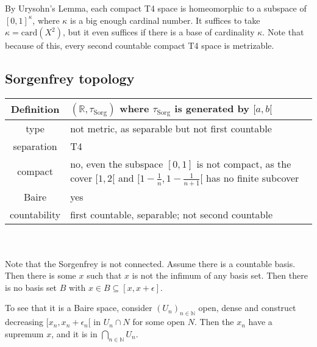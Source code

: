 \documentclass{scrartcl}
\newcommand{\R}{\mathbb{R}}
\newcommand{\N}{\mathbb{N}}
\begin{document}
By Urysohn's Lemma, each compact T4 space is homeomorphic to a subspace of $[0, 1]^\kappa$, where $\kappa$ is a big enough cardinal number. It suffices to take $\kappa = \mathrm{card}(X^2)$, but it even suffices if there is a base of cardinality $\kappa$. Note that because of this, every second countable compact T4 space is metrizable.

\subsection{Sorgenfrey topology}
\label{top:sorgenfrey}
\begin{tabular}{c | p{}}
    Definition & $(\R, \tau_{\mathrm{Sorg}})$ where $\tau_{\mathrm{Sorg}}$ is generated by $[a, b[$ \\
    \hline
    type & not metric, as separable but not first countable \\
    separation & T4 \\
    compact & no, even the subspace $[0, 1]$ is not compact, as the cover $[1, 2[$ and $[1 - \frac 1 n, 1 - \frac 1 {n + 1}[$ has no finite subcover \\
    Baire & yes \\
    countability & first countable, separable; not second countable
\end{tabular}
\\\\
Note that the Sorgenfrey is not connected. Assume there is a countable basis. Then there is some $x$ such that $x$ is not the infimum of any basis set. Then there is no basis set $B$ with $x \in B \subseteq [x, x + \epsilon]$.

To see that it is a Baire space, consider $(U_n)_{n \in \N}$ open, dense and construct decreasing $[x_n, x_n + \epsilon_n[$ in $U_n \cap N$ for some open $N$. Then the $x_n$ have a supremum $x$, and it is in $\bigcap_{n \in \N} U_n$.
\end{document}
